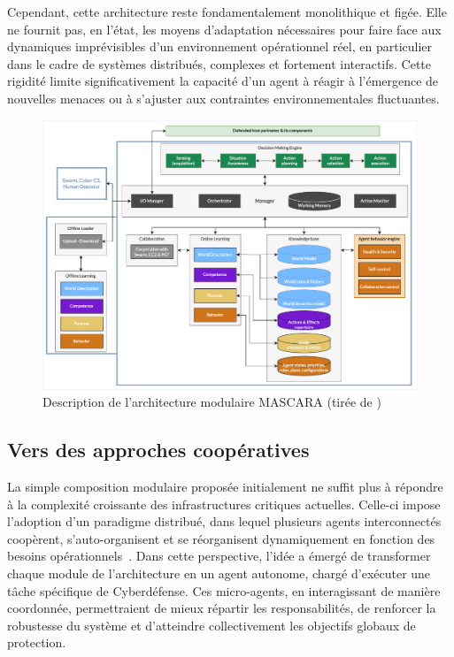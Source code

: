Cependant, cette architecture reste fondamentalement monolithique et figée. Elle ne fournit pas, en l'état, les moyens d'adaptation nécessaires pour faire face aux dynamiques imprévisibles d'un environnement opérationnel réel, en particulier dans le cadre de systèmes distribués, complexes et fortement interactifs. Cette rigidité limite significativement la capacité d'un agent  à réagir à l'émergence de nouvelles menaces ou à s'ajuster aux contraintes environnementales fluctuantes.


\begin{figure}[h!]
    \centering
    \includegraphics[width=\linewidth]{figures/MASCARA.pdf}
    \caption{Description de l'architecture modulaire MASCARA (tirée de \autocite{Kott2023})}
    \label{fig:mascara}
\end{figure}

\subsection*{Vers des approches coopératives}

La simple composition modulaire proposée initialement ne suffit plus à répondre à la complexité croissante des infrastructures critiques actuelles. Celle-ci impose l'adoption d'un paradigme distribué, dans lequel plusieurs agents interconnectés coopèrent, s'auto-organisent et se réorganisent dynamiquement en fonction des besoins opérationnels~\cite{Ferber1999, Gleizes2008}. Dans cette perspective, l'idée a émergé de transformer chaque module de l'architecture  en un agent autonome, chargé d'exécuter une tâche spécifique de Cyberdéfense. Ces micro-agents, en interagissant de manière coordonnée, permettraient de mieux répartir les responsabilités, de renforcer la robustesse du système et d'atteindre collectivement les objectifs globaux de protection.

